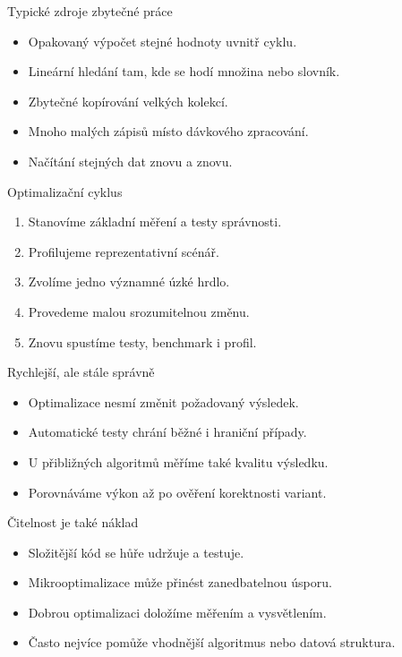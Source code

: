 \documentclass[aspectratio=169]{beamer}
\begin{document}
\begin{frame}{Typické zdroje zbytečné práce}
\begin{itemize}
\item Opakovaný výpočet stejné hodnoty uvnitř cyklu.
\item Lineární hledání tam, kde se hodí množina nebo slovník.
\item Zbytečné kopírování velkých kolekcí.
\item Mnoho malých zápisů místo dávkového zpracování.
\item Načítání stejných dat znovu a znovu.
\end{itemize}
\end{frame}

\begin{frame}{Optimalizační cyklus}
\begin{enumerate}
\item Stanovíme základní měření a testy správnosti.
\item Profilujeme reprezentativní scénář.
\item Zvolíme jedno významné úzké hrdlo.
\item Provedeme malou srozumitelnou změnu.
\item Znovu spustíme testy, benchmark i profil.
\end{enumerate}
\end{frame}

\begin{frame}{Rychlejší, ale stále správně}
\begin{itemize}
\item Optimalizace nesmí změnit požadovaný výsledek.
\item Automatické testy chrání běžné i hraniční případy.
\item U přibližných algoritmů měříme také kvalitu výsledku.
\item Porovnáváme výkon až po ověření korektnosti variant.
\end{itemize}
\end{frame}

\begin{frame}{Čitelnost je také náklad}
\begin{itemize}
\item Složitější kód se hůře udržuje a testuje.
\item Mikrooptimalizace může přinést zanedbatelnou úsporu.
\item Dobrou optimalizaci doložíme měřením a vysvětlením.
\item Často nejvíce pomůže vhodnější algoritmus nebo datová struktura.
\end{itemize}
\end{frame}
\end{document}
